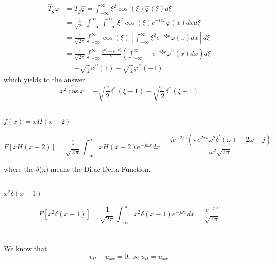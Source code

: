 \documentclass{article}
\begin{document}
\begin{align*}
\hat { T } _ { g } \varphi& = T _ { g } \hat { \varphi } = \int _ { - \infty } ^ { \infty } \xi ^ { 2 } \cos ( \xi ) \hat {\varphi }  ( \xi ) d \xi\\
&= \frac { 1 }{ \sqrt { 2 \pi } } \int _ { - \infty } ^ { \infty } \int _ { - \infty } ^ { \infty } \xi ^ { 2 } \cos ( \xi ) e ^ { - i x \xi } \varphi ( x ) d x d \xi\\
&=\frac { 1 } { \sqrt { 2 \pi } } \int _ { - \infty } ^ { \infty } \cos ( \xi ) \left[ \int _ { - \infty } ^ { \infty } \xi ^ { 2 } e ^ { - i \xi x } \varphi ( x ) d x \right] d \xi\\
&= \frac { 1 } { \sqrt { 2 \pi } } \int _ { - \infty } ^ { \infty } \frac { e ^ { i \xi } + e ^ { - i \xi } } { 2 } \left( \int _ { - \infty } ^ { \infty } - e ^ { - i \xi x } \varphi ^ { \prime \prime } ( x ) d x \right) d \xi\\
&=-\sqrt { \frac { \pi } { 2 } } \varphi ^ { \prime \prime } ( 1 ) - \sqrt { \frac { \pi } { 2 } } \varphi ^ { \prime \prime } ( - 1)
\end{align*}
which yields to the answer
$$ \widehat{x ^ { 2 } \cos x}= - \sqrt { \frac { \pi } { 2 } } \delta ^ { \prime \prime } ( \xi - 1 ) - \sqrt { \frac { \pi } { 2 } } \delta ^ { \prime \prime } ( \xi + 1 )$$
\subsection{}
$f(x)=xH(x-2)$


\[
F\left[xH\left(x-2\right)\right]=\frac{1}{\sqrt{2\pi{}}}\int_{-\infty{}}^{\infty{}}xH\left(x-2\right)e^{-j\omega{}x}dx=\frac{je^{-2j\omega{}}(\pi{}e^{2j\omega{}}{\omega{}}^2{\delta{}}^{'}\left(\omega{}\right)-2\omega{}+j)}{{\omega{}}^2\sqrt{2\pi{}}}
\]


where the $\delta{}$(x) means the Dirac Delta Function.
\subsection{}
 $x^2\delta{}(x-1)$

\[
F\left[x^2\delta{}\left(x-1\right)\right]=\frac{1}{\sqrt{2\pi{}}}\int_{-\infty{}}^{\infty{}}x^2\delta{}\left(x-1\right)e^{-j\omega{}x}dx=\frac{e^{-j\omega{}}}{\sqrt{2\pi{}}}
\]

\section{}

We know that $$u_{tt}-u_{xx}=0,\ so\ u_{tt}=u_{xx}\ $$
\end{document}
